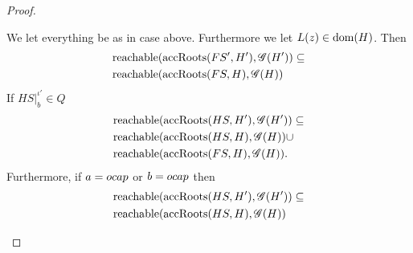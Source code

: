 \begin{proof}
\begin{description}
\begin{description}
\begin{description}
              \begin{lemma} \label{lem:2.15}
                We let everything be as in case \EAssign{} above. Furthermore we
                let $L(z) \in \mbox{$\mathrm{dom}$}(H)$. Then
                \begin{equation} \label{eq:lem2.15a}
                  \begin{aligned}
                    &\mbox{$\mathrm{reachable}$}(\mbox{$\mathrm{accRoots}$}(FS', H'), \mathscr{G}(H')) \subseteq \\
                    &\mbox{$\mathrm{reachable}$}(\mbox{$\mathrm{accRoots}$}(FS, H), \mathscr{G}(H))
                  \end{aligned}
                \end{equation}
                If $HS|_b^{\iota'} \in Q$
                \begin{equation}\label{eq:lem2.15b}
                  \begin{aligned}
                    &\mbox{$\mathrm{reachable}$}(\mbox{$\mathrm{accRoots}$}(HS, H'), \mathscr{G}(H')) \subseteq \\
                    &\mbox{$\mathrm{reachable}$}(\mbox{$\mathrm{accRoots}$}(HS, H), \mathscr{G}(H)) \cup  \\
                    &\mbox{$\mathrm{reachable}$}(\mbox{$\mathrm{accRoots}$}(FS, H), \mathscr{G}(H)).
                  \end{aligned}
                \end{equation}
                Furthermore, if $a = \mbox{$ocap$}$ or $b = \mbox{$ocap$}$ then
                \begin{equation}\label{eq:lem2.15c}
                  \begin{aligned}
                    &\mbox{$\mathrm{reachable}$}(\mbox{$\mathrm{accRoots}$}(HS, H'), \mathscr{G}(H')) \subseteq \\
                    &\mbox{$\mathrm{reachable}$}(\mbox{$\mathrm{accRoots}$}(HS, H), \mathscr{G}(H))
                  \end{aligned}
                \end{equation}
              \end{lemma}


\end{description}
\end{description}
\end{description}
\end{proof}
